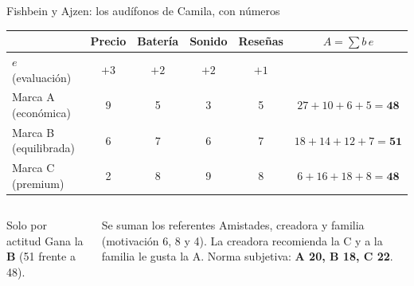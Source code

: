 \documentclass[aspectratio=169,xcolor=dvipsnames]{beamer}
\begin{document}
\begin{frame}{Fishbein y Ajzen: los audífonos de Camila, con números}
\scriptsize
\begin{center}
\begin{tabular}{@{}lcccc|c@{}}
\toprule
 & Precio & Batería & Sonido & Reseñas & $A=\sum b\,e$ \\
\midrule
$e$ (evaluación) & $+3$ & $+2$ & $+2$ & $+1$ & \\
Marca A (económica) & 9 & 5 & 3 & 5 & $27+10+6+5=\mathbf{48}$ \\
Marca B (equilibrada) & 6 & 7 & 6 & 7 & $18+14+12+7=\mathbf{51}$ \\
Marca C (premium) & 2 & 8 & 9 & 8 & $6+16+18+8=\mathbf{48}$ \\
\bottomrule
\end{tabular}
\end{center}
\vspace{2pt}
\begin{columns}[T]
  \begin{exampleblock}{Solo por actitud}
    \small Gana la \textbf{B} (51 frente a 48).
  \end{exampleblock}
  \begin{alertblock}{Se suman los referentes}
    \footnotesize Amistades, creadora y familia (motivación 6, 8 y 4). La creadora recomienda la C y a la familia le gusta la A. Norma subjetiva: \textbf{A 20, B 18, C 22}.
  \end{alertblock}
\end{columns}
\end{frame}
\end{document}
